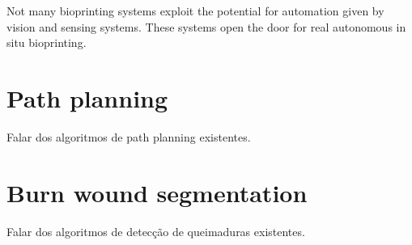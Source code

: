Not many bioprinting systems exploit the potential for automation given by vision and sensing systems. These systems open the door for real autonomous in situ bioprinting.


\section{Path planning}
\label{sec:path_planning}

Falar dos algoritmos de path planning existentes.


\section{Burn wound segmentation}
\label{sec:burn_wound_segmentation}

Falar dos algoritmos de detecção de queimaduras existentes.

